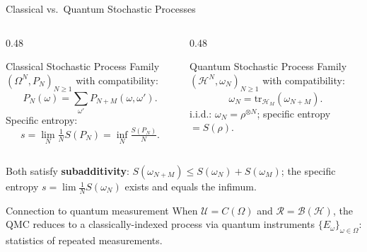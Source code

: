 \documentclass{beamer}
\newcommand{\Hilb}{\mathcal{H}}
\newcommand{\Bound}{\mathcal{B}}
\newcommand{\tr}{\mathrm{tr}}
\begin{document}
\begin{frame}[shrink=10]{Classical vs.\ Quantum Stochastic Processes}
  \small
  \begin{columns}[T]
    \begin{column}{0.48\textwidth}
      \begin{block}{Classical Stochastic Process}
        Family $(\Omega^N,P_N)_{N\ge 1}$ with compatibility:
        \[P_N(\omega)=\sum_{\omega'}P_{N+M}(\omega,\omega').\]
        Specific entropy:
        \[s=\lim_{N}\tfrac{1}{N}S(P_N)=\inf_N\tfrac{S(P_N)}{N}.\]
      \end{block}
    \end{column}
    \begin{column}{0.48\textwidth}
      \begin{block}{Quantum Stochastic Process}
        Family $(\Hilb^N,\omega_N)_{N\ge 1}$ with compatibility:
        \[\omega_N=\tr_{\Hilb_M}(\omega_{N+M}).\]
        i.i.d.: $\omega_N=\rho^{\otimes N}$; specific entropy $=S(\rho)$.
      \end{block}
    \end{column}
  \end{columns}

  \vspace{0.2em}
  \begin{tcolorbox}[mathbox, left=3pt, right=3pt, top=1pt, bottom=1pt]
    Both satisfy \textbf{subadditivity}: $S(\omega_{N+M})\le S(\omega_N)+S(\omega_M)$;
    the specific entropy $s=\lim \tfrac{1}{N}S(\omega_N)$ exists and equals the infimum.
  \end{tcolorbox}

  \begin{alertblock}{Connection to quantum measurement}
  \justifying
    When $\mathcal{U}=C(\Omega)$ and $\mathcal{R}=\Bound(\Hilb)$, the QMC
    reduces to a classically-indexed process via quantum instruments
    $\{E_\omega\}_{\omega\in\Omega}$: statistics of repeated measurements.
  \end{alertblock}
\end{frame}
\end{document}
